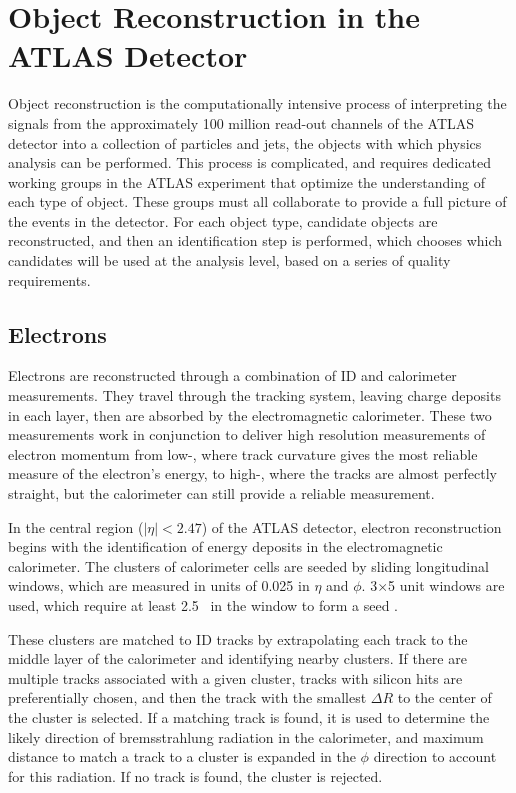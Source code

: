 \chapter{Object Reconstruction in the ATLAS Detector} %
\label{ch:reconstruction} 

Object reconstruction is the computationally intensive process of interpreting the signals from the approximately 100 million read-out channels of the \ac{ATLAS} detector into a collection of particles and jets, the objects with which physics analysis can be performed. This process is complicated, and requires dedicated working groups in the \ac{ATLAS} experiment that optimize the understanding of each type of object. These groups must all collaborate to provide a full picture of the events in the detector. For each object type, candidate objects are reconstructed, and then an identification step is performed, which chooses which candidates will be used at the analysis level, based on a series of quality requirements.


\section{Electrons}
\label{sec:reco_electrons}

Electrons are reconstructed through a combination of \ac{ID} and calorimeter measurements. They travel through the tracking system, leaving charge deposits in each layer, then are absorbed by the electromagnetic calorimeter. These two measurements work in conjunction to deliver high resolution measurements of electron momentum from low-\pt, where track curvature gives the most reliable measure of the electron's energy, to high-\pt, where the tracks are almost perfectly straight, but the calorimeter can still provide a reliable measurement. 

In the central region ($|\eta|<2.47$) of the \ac{ATLAS} detector, electron reconstruction begins with the identification of energy deposits in the electromagnetic calorimeter. The clusters of calorimeter cells are seeded by sliding longitudinal windows, which are measured in units of 0.025 in $\eta$ and $\phi$. 3$\times$5 unit windows are used, which require at least 2.5 \gev~in the window to form a seed \cite{Aad:2011mk}. 

These clusters are matched to \ac{ID} tracks by extrapolating each track to the middle layer of the calorimeter and identifying nearby clusters. If there are multiple tracks associated with a given cluster, tracks with silicon hits are preferentially chosen, and then the track with the smallest $\Delta R$ to the center of the cluster is selected. If a matching track is found, it is used to determine the likely direction of bremsstrahlung radiation in the calorimeter, and maximum distance to match a track to a cluster is expanded in the $\phi$ direction to account for this radiation. If no track is found, the cluster is rejected. 

